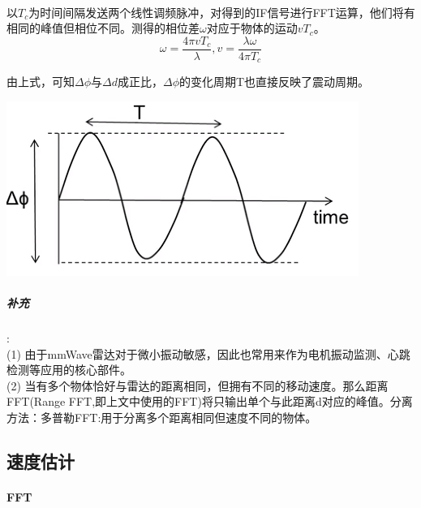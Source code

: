 \documentclass[UTF8]{ctexart}
\begin{document}
\paragraph{}以$T_c$为时间间隔发送两个线性调频脉冲，对得到的IF信号进行FFT运算，他们将有相同的峰值但相位不同。测得的相位差$\omega$对应于物体的运动$vT_c$。\\
\[\omega=\frac{4\pi v T_c}{\lambda} ,v=\frac{\lambda \omega}{4\pi T_c}\]



由上式，可知$\Delta \phi$与$\Delta d$成正比，$\Delta \phi$的变化周期T也直接反映了震动周期。

{\centering \includegraphics[width = .4\textwidth]{pic/deltaphase.png}

}

\subparagraph{补充}:\\
(1) 由于mmWave雷达对于微小振动敏感，因此也常用来作为电机振动监测、心跳检测等应用的核心部件。\\
(2) 当有多个物体恰好与雷达的距离相同，但拥有不同的移动速度。那么距离FFT(Range FFT,即上文中使用的FFT)将只输出单个与此距离d对应的峰值。分离方法：多普勒FFT:用于分离多个距离相同但速度不同的物体。
\subsection{速度估计}
\paragraph{FFT}
\end{document}
